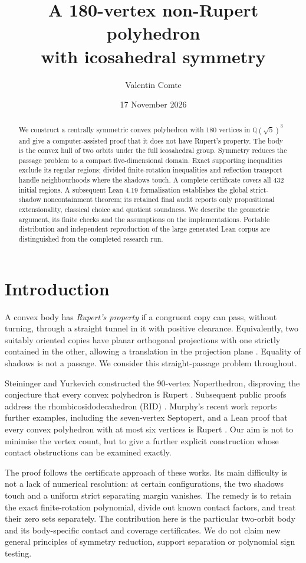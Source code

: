\documentclass[11pt,a4paper]{article}
\title{A 180-vertex non-Rupert polyhedron\\with icosahedral symmetry}
\author{Valentin Comte}
\date{17 November 2026}
\newcommand{\Q}{\mathbb Q}
\begin{document}
\maketitle
\begin{abstract}
We construct a centrally symmetric convex polyhedron with 180 vertices in
$\Q(\sqrt5)^3$ and give a computer-assisted proof that it does not have
Rupert's property. The body is the convex hull of two orbits under the full
icosahedral group. Symmetry reduces the passage problem to a compact
five-dimensional domain. Exact supporting inequalities exclude its regular
regions; divided finite-rotation inequalities and reflection transport handle
neighbourhoods where the shadows touch. A complete certificate covers all
432 initial regions. A subsequent Lean 4.19 formalisation establishes the
global strict-shadow noncontainment theorem; its retained final audit reports
only propositional extensionality, classical choice and quotient soundness.
We describe the geometric argument, its finite checks and the assumptions on
the implementations. Portable distribution and independent reproduction of
the large generated Lean corpus are distinguished from the completed research run.
\end{abstract}

\section{Introduction}
A convex body has \emph{Rupert's property} if a congruent copy can pass,
without turning, through a straight tunnel in it with positive clearance.
Equivalently, two suitably oriented copies have planar orthogonal projections
with one strictly contained in the other, allowing a translation in the
projection plane \cite{SYalgorithm}. Equality of shadows is not a passage.
We consider this straight-passage problem throughout.

Steininger and Yurkevich constructed the 90-vertex Noperthedron, disproving
the conjecture that every convex polyhedron is Rupert \cite{SYnopert}.
Subsequent public proofs address the rhombicosidodecahedron (RID)
\cite{Hervay,Smith,Jung}. Murphy's recent work reports further examples,
including the seven-vertex Septopert, and a Lean proof that every convex
polyhedron with at most six vertices is Rupert \cite{Murphy}.
Our aim is not to minimise the vertex count, but to give a further explicit
construction whose contact obstructions can be examined exactly.

The proof follows the certificate approach of these works. Its main
difficulty is not a lack of numerical resolution: at certain configurations,
the two shadows touch and a uniform strict separating margin vanishes.
The remedy is to retain the exact finite-rotation polynomial, divide out
known contact factors, and treat their zero sets separately. The contribution
here is the particular two-orbit body and its body-specific contact and
coverage certificates. We do not claim new general principles of symmetry
reduction, support separation or polynomial sign testing.
\end{document}
